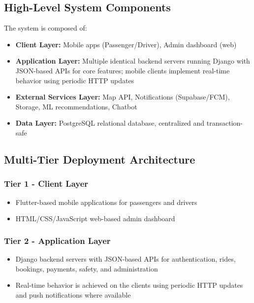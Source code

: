 \subsection{High-Level System Components}

The system is composed of:
\begin{itemize}
    \item \textbf{Client Layer:} Mobile apps (Passenger/Driver), Admin dashboard (web)
    \item \textbf{Application Layer:} Multiple identical backend servers running Django with JSON-based APIs for core features; mobile clients implement real-time behavior using periodic HTTP updates
    \item \textbf{External Services Layer:} Map API, Notifications (Supabase/FCM), Storage, ML recommendations, Chatbot
    \item \textbf{Data Layer:} PostgreSQL relational database, centralized and transaction-safe
\end{itemize}

\subsection{Multi-Tier Deployment Architecture}

\subsubsection{Tier 1 - Client Layer}
\begin{itemize}
    \item Flutter-based mobile applications for passengers and drivers
    \item HTML/CSS/JavaScript web-based admin dashboard
\end{itemize}

\subsubsection{Tier 2 - Application Layer}
\begin{itemize}
    \item Django backend servers with JSON-based APIs for authentication, rides, bookings, payments, safety, and administration
    \item Real-time behavior is achieved on the clients using periodic HTTP updates and push notifications where available
\end{itemize}

